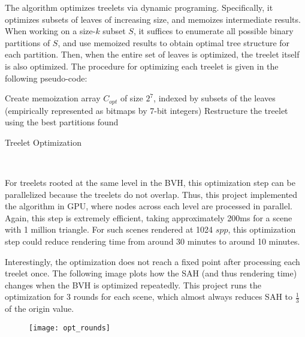 The algorithm optimizes treelets via dynamic programing. Specifically, it optimizes subsets of leaves of increasing size, and memoizes intermediate results. When working on a size-$k$ subset $S$, it suffices to enumerate all possible binary partitions of $S$, and use memoized results to obtain optimal tree structure for each partition. Then, when the entire set of leaves is optimized, the treelet itself is also optimized. The procedure for optimizing each treelet is given in the following pseudo-code:

\begin{algorithm}[H]
    \label{algo optimize treelet}
    Create memoization array $C_{opt}$ of size $2^7$, indexed by subsets of the leaves (empirically represented as bitmaps by 7-bit integers)\;
    Restructure the treelet using the best partitions found\;
    \caption{Treelet Optimization}
\end{algorithm} 

~

For treelets rooted at the same level in the BVH, this optimization step can be parallelized because the treelets do not overlap. Thus, this project implemented the algorithm in GPU, where nodes across each level are processed in parallel. Again, this step is extremely efficient, taking approximately 200ms for a scene with 1 million triangle. For such scenes rendered at 1024 $spp$, this optimization step could reduce rendering time from around 30 minutes to around 10 minutes.

\thispagestyle{empty}
\enlargethispage{5\baselineskip}

Interestingly, the optimization does not reach a fixed point after processing each treelet once. The following image plots how the SAH (and thus rendering time) changes when the BVH is optimized repeatedly. This project runs the optimization for 3 rounds for each scene, which almost always reduces SAH to $\frac{1}{3}$ of the origin value.

\begin{figure}[H]
    \centering
    \texttt{[image: opt\_rounds]}
\end{figure}

